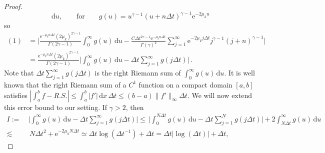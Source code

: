\documentclass[12pt]{article} %
\newcommand{\dint}{\text{d}}
\newcommand{\abs}[1]{\left| #1 \right|}
\begin{document}
\begin{proof}
$$\, \dint u, \qquad \text{for}\qquad g(u)=u^{\gamma - 1} (u +  n\Delta t)^{\gamma - 1}\mathrm{e}^{-2 \mu_k u}$$
so
%
\begin{align*}
(1) & = \bigg| \frac{\mathrm{e}^{-\mu_k  n\Delta t } (2 \mu_k)^{2 \gamma - 1}}{\Gamma(2 \gamma - 1)} \int_{0}^{\infty}  g(u) 
\, \dint u - \frac{C \Delta t^{2 \gamma - 1} \mathrm{e}^{-\mu_k n\Delta t}}{\Gamma(\gamma)^2} \sum_{j = 1}^{\infty} \mathrm{e}^{-2 \mu_k j \Delta t } j^{\gamma - 1} (j + n)^{\gamma - 1} \bigg|\\
 & = \frac{\mathrm{e}^{- \mu_k  n\Delta t }(2 \mu_k)^{2 \gamma - 1}}{\Gamma(2 \gamma - 1)} \bigg| \int_{0}^{\infty}  g(u) 
 \, \dint u - \Delta t \sum_{j = 1}^{\infty}  g(j\Delta t) 
 \bigg|
\, .
\end{align*}
%
Note that $\Delta t \sum_{j = 1}^{\infty}  g(j\Delta t) 
$ is the right Riemann sum of $\int_{0}^{\infty}  g(u) 
\, \dint u $. It is well known that the right Riemann sum of a $C^1$ function on a compact domain $[a,b]$ satisfies $|\int_a^b f - R.S.|  \leq \int_a^b|f'|\,\dint x\,\Delta t \leq (b - a)\|f'\|_\infty \Delta t$. We will now extend this error bound to our setting. If $\gamma > 2$, then 
\begin{align*}
   I:=\ & \bigg| \int_{0}^{\infty}  g(u)  
   \, \dint u - \Delta t \sum_{j = 1}^{\infty}  g(j\Delta t) 
   \bigg| %
    \leq %
    \, \bigg| \int_{0}^{N\Delta t}  g(u)  
    \, \dint u - \Delta t \sum_{j = 1}^{N}  g(j\Delta t) 
    \bigg| + 2 \int_{N\Delta t}^\infty  g(u)  
    \, \dint u \\
    \lesssim & \, N\Delta t^2 + \mathrm{e}^{-2 \mu_k N \Delta t} \simeq \Delta t \log \left(\Delta t^{-1}\right) + \Delta t = \Delta t \abs{ \log(\Delta t) } + \Delta t,

\end{align*}
\end{proof}
\end{document}
